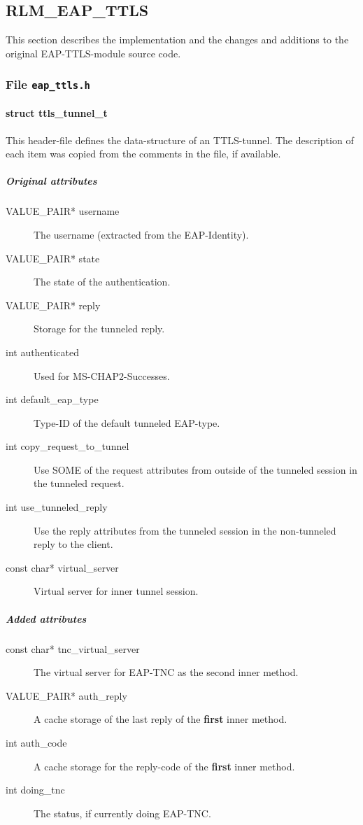 \subsection{RLM\_EAP\_TTLS}
This section describes the implementation and the changes and additions to the original EAP-TTLS-module source code.


\subsubsection{File \texttt{eap\_ttls.h}}
\paragraph{struct ttls\_tunnel\_t}
This header-file defines the data-structure of an TTLS-tunnel.
The description of each item was copied from the comments in the file, if available.

\subparagraph{Original attributes}
\begin{description}
	\item[VALUE\_PAIR* username] The username (extracted from the EAP-Identity).
	\item[VALUE\_PAIR* state] The state of the authentication.
	\item[VALUE\_PAIR* reply] Storage for the tunneled reply.
	\item[int authenticated] Used for MS-CHAP2-Successes.
	\item[int default\_eap\_type] Type-ID of the default tunneled EAP-type.
	\item[int copy\_request\_to\_tunnel] Use SOME of the request attributes from outside of the tunneled session in the tunneled request.
	\item[int use\_tunneled\_reply] Use the reply attributes from the tunneled session in the non-tunneled reply to the client.
	\item[const char* virtual\_server] Virtual server for inner tunnel session.
\end{description}

\subparagraph{Added attributes}
\begin{description}
	\item[const char* tnc\_virtual\_server] The virtual server for EAP-TNC as the second inner method.
	\item[VALUE\_PAIR* auth\_reply] A cache storage of the last reply of the \textbf{first} inner method.
	\item[int auth\_code] A cache storage for the reply-code of the \textbf{first} inner method.
	\item[int doing\_tnc] The status, if currently doing EAP-TNC.
\end{description}

